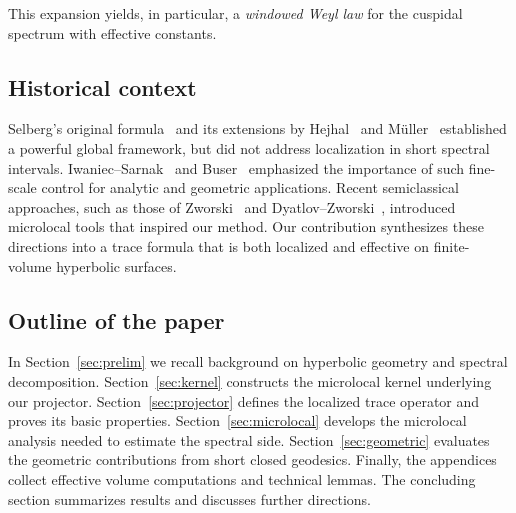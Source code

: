 This expansion yields, in particular, a \emph{windowed Weyl law} for the cuspidal spectrum with effective constants. 

\subsection{Historical context}
Selberg’s original formula~\cite{selberg1956} and its extensions by Hejhal~\cite{hejhal1976,hejhal1983} and M\"uller~\cite{mueller1983} established a powerful global framework, but did not address localization in short spectral intervals. 
Iwaniec–Sarnak~\cite{iwaniec1995} and Buser~\cite{buser1992} emphasized the importance of such fine-scale control for analytic and geometric applications. 
Recent semiclassical approaches, such as those of Zworski~\cite{zworski2012} and Dyatlov–Zworski~\cite{dyatlovzworski2019}, introduced microlocal tools that inspired our method. 
Our contribution synthesizes these directions into a trace formula that is both localized and effective on finite-volume hyperbolic surfaces. 

\subsection{Outline of the paper}
In Section~\ref{sec:prelim} we recall background on hyperbolic geometry and spectral decomposition. 
Section~\ref{sec:kernel} constructs the microlocal kernel underlying our projector. 
Section~\ref{sec:projector} defines the localized trace operator and proves its basic properties. 
Section~\ref{sec:microlocal} develops the microlocal analysis needed to estimate the spectral side. 
Section~\ref{sec:geometric} evaluates the geometric contributions from short closed geodesics. 
Finally, the appendices collect effective volume computations and technical lemmas. 
The concluding section summarizes results and discusses further directions.
